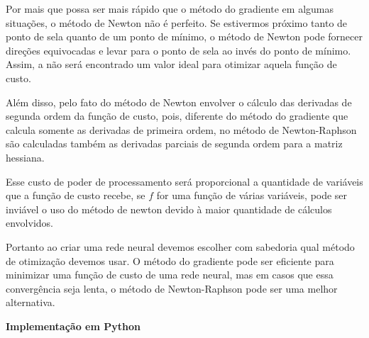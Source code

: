Por mais que possa ser mais rápido que o método do gradiente em algumas situações, o método de Newton não é perfeito. Se estivermos próximo tanto de ponto de sela quanto de um ponto de mínimo, o método de Newton pode fornecer direções equivocadas e levar para o ponto de sela ao invés do ponto de mínimo. Assim, a não será encontrado um valor ideal para otimizar aquela função de custo.

Além disso, pelo fato do método de Newton envolver o cálculo das derivadas de segunda ordem da função de custo, pois, diferente do método do gradiente que calcula somente as derivadas de primeira ordem, no método de Newton-Raphson são calculadas também as derivadas parciais de segunda ordem para a matriz hessiana.

 Esse custo de poder de processamento será proporcional a quantidade de variáveis que a função de custo recebe, se $f$ for uma função de várias variáveis, pode ser inviável o uso do método de newton devido à maior quantidade de cálculos envolvidos.

Portanto ao criar uma rede neural devemos escolher com sabedoria qual método de otimização devemos usar. O método do gradiente pode ser eficiente para minimizar uma função de custo de uma rede neural, mas em casos que essa convergência seja lenta, o método de Newton-Raphson pode ser uma melhor alternativa.

\textbf{Implementação em Python}

